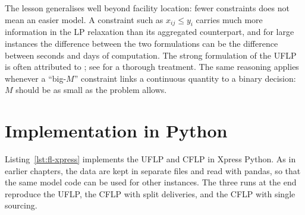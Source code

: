 The lesson generalises well beyond facility location: fewer constraints does not mean an easier model. A constraint such as $x_{ij}\le y_i$ carries much more information in the LP relaxation than its aggregated counterpart, and for large instances the difference between the two formulations can be the difference between seconds and days of computation. The strong formulation of the UFLP is often attributed to \citet{Balinski1965}; see \citet{Cornuejols1990} for a thorough treatment. The same reasoning applies whenever a ``big-$M$'' constraint links a continuous quantity to a binary decision: $M$ should be as small as the problem allows.


\section{Implementation in Python}
\label{sec:fl-python}

Listing~\ref{lst:fl-xpress} implements the UFLP and CFLP in Xpress Python. As in earlier chapters, the data are kept in separate files and read with pandas, so that the same model code can be used for other instances. The three runs at the end reproduce the UFLP, the CFLP with split deliveries, and the CFLP with single sourcing.

